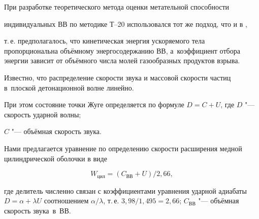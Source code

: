 \smallskip




При разработке теоретического метода оценки метательной способности

индивидуальных ВВ по методике Т--20 использовался тот же подход, что и в \cite{reut1:bib6},

т.\,е. предполагалось, что кинетическая энергия ускоряемого тела пропорциональна объёмному энергосодержанию ВВ, а~коэффициент отбора энергии зависит от объёмного числа молей газообразных продуктов взрыва.



Известно, что распределение скорости звука и массовой скорости частиц в~плоской детонационной волне линейно. 

При этом состояние точки Жуге определяется по формуле $D=C+U$, где $D$ "--- скорость ударной волны;

$C$ "--- объёмная скорость звука.


Нами предлагается уравнение по определению скорости расширения медной цилиндрической оболочки в виде

$$

 W_{\text{цил}} =({C_{\text{ВВ}} +U})/{2,66},

$$

где делитель численно связан с коэффициентами уравнения ударной адиабаты $D=\alpha + \lambda U$ соотношением $\alpha/\lambda$, т.\,е. $3,98/1,495=2,66$; $C_{\text{ВВ}}$ "--- объёмная скорость звука~в~ВВ.





